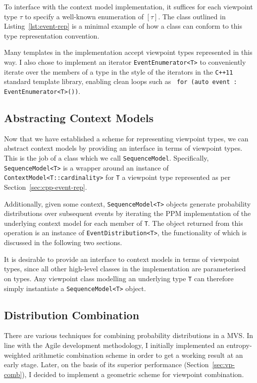 \documentclass[12pt,a4paper,twoside,openright]{report}
\newcommand{\sref}[1]{Section~\ref{#1}}
\newcommand{\cppi}[1]{{\small \texttt{#1}}}
\begin{document}
To interface with the context model implementation, it suffices for each
viewpoint type $\tau$ to specify a well-known enumeration of $[\tau]$. The class
outlined in Listing~\ref{lst:event-rep} is a minimal example of how a class can
conform to this type representation convention.

Many templates in the implementation accept viewpoint types represented in this
way. I also chose to implement an iterator \texttt{EventEnumerator<T>} to
conveniently iterate over the members of a type in the style of the iterators in
the \texttt{C++11} standard template library, enabling clean loops such as~
\cppi{for (auto event : EventEnumerator<T>())}.

\subsection{Abstracting Context Models}

Now that we have established a scheme for representing viewpoint types, we can
abstract context models by providing an interface in terms of viewpoint types.
This is the job of a class which we call \texttt{SequenceModel}.  Specifically,
\texttt{SequenceModel<T>} is a wrapper around an instance of
\texttt{ContextModel<T::cardinality>} for \texttt{T} a viewpoint type
represented as per \sref{sec:cpp-event-rep}. 

Additionally, given some context, \texttt{SequenceModel<T>} objects generate
probability distributions over subsequent events by iterating the PPM
implementation of the underlying context model for each member of \texttt{T}.
The object returned from this operation is an instance of
\texttt{EventDistribution<T>}, the functionality of which is discussed in the
following two sections.

It is desirable to provide an interface to context models in terms of viewpoint
types, since all other high-level classes in the implementation are
parameterised on types. Any viewpoint class modelling an underlying type
\texttt{T} can therefore simply instantiate a \texttt{SequenceModel<T>} object.

\subsection{Distribution Combination}

There are various techniques for combining probability distributions in a MVS.
In line with the Agile development methodology, I initially implemented an
entropy-weighted arithmetic combination scheme in order to get a working result
at an early stage. Later, on the basis of its superior performance
(\sref{sec:vp-comb}), I decided to implement a geometric scheme for
viewpoint combination.  
\end{document}

